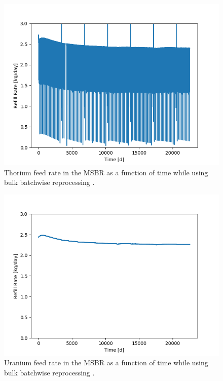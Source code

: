 \begin{figure}[H]
  \centering
  \includegraphics[scale=0.75]{images/Th232rem_massv01.png}
  \caption{Thorium feed rate in the MSBR as a function of time while using bulk batchwise reprocessing \cite{rykhlevskii_advanced_2018}.}
   \label{fig:Th-feed-v1}
\end{figure}

\begin{figure}[H]
  \centering
  \includegraphics[scale=0.75]{images/Pa233rem_massv01.png}
  \caption{Uranium feed rate in the MSBR as a function of time while using bulk batchwise reprocessing \cite{rykhlevskii_advanced_2018}.}
   \label{fig:U-feed-v1}
\end{figure}


